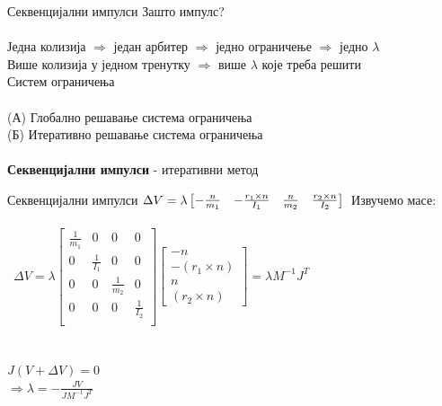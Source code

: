 \documentclass[]{beamer}
\begin{document}
\begin{frame}{Секвенцијални импулси}
    Зашто импулс? \\
    \\
    Једна колизија $\Rightarrow$ један арбитер $\Rightarrow$ једно ограничење $\Rightarrow$ једно $\lambda$ \\
    Више колизија у једном тренутку $\Rightarrow$ више $\lambda$ које треба решити \\
    Систем ограничења \\
    \\
    (А) Глобално решавање система ограничења \\
    (Б) Итеративно решавање система ограничења \\
    \\
    \textbf{Секвенцијални импулси} - итеративни метод
\end{frame}

\begin{frame}{Секвенцијални импулси}
    $ \Delta V =  \lambda 
    \begin{bmatrix} 
        -\frac{n}{m_1} & -\frac{r_1 \times n}{I_1} & \frac{n}{m_2} & \frac{r_2 \times n}{I_2}
    \end{bmatrix} \\ $
    Извучемо масе: \\
    \\\
    $
    \Delta V = \lambda 
    \begin{bmatrix}
        \frac{1}{m_1} & 0 & 0 & 0 \\
        0 & \frac{1}{I_1} & 0 & 0 \\
        0 & 0 & \frac{1}{m_2} & 0 \\
        0 & 0 & 0 & \frac{1}{I_2} \\
    \end{bmatrix}
    \begin{bmatrix}
        -n \\
        -(r_1 \times n) \\
        n \\
        (r_2 \times n)
    \end{bmatrix}
    = \lambda M^{-1}J^T
    $ \\
    \\
    \\
    $J(V + \Delta V) = 0$ \\
    $\Rightarrow \lambda = -\frac{JV}{J M^{-1} J^T}$\\
\end{frame}
\end{document}

